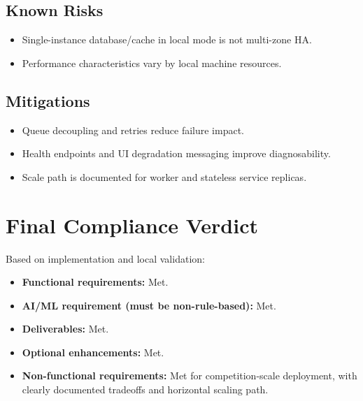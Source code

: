 \documentclass[11pt,a4paper]{article}
\begin{document}
\subsection{Known Risks}
\begin{itemize}[leftmargin=1.2em]
  \item Single-instance database/cache in local mode is not multi-zone HA.
  \item Performance characteristics vary by local machine resources.
\end{itemize}

\subsection{Mitigations}
\begin{itemize}[leftmargin=1.2em]
  \item Queue decoupling and retries reduce failure impact.
  \item Health endpoints and UI degradation messaging improve diagnosability.
  \item Scale path is documented for worker and stateless service replicas.
\end{itemize}

\section{Final Compliance Verdict}
Based on implementation and local validation:
\begin{itemize}[leftmargin=1.2em]
  \item \textbf{Functional requirements:} Met.
  \item \textbf{AI/ML requirement (must be non-rule-based):} Met.
  \item \textbf{Deliverables:} Met.
  \item \textbf{Optional enhancements:} Met.
  \item \textbf{Non-functional requirements:} Met for competition-scale deployment, with clearly documented tradeoffs and horizontal scaling path.
\end{itemize}

\appendix
\end{document}
